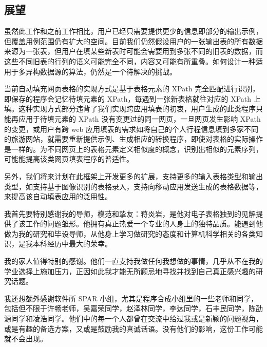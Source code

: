 \documentclass[design, pageheader]{njubachelor}
\begin{document}
\subsection{展望}
虽然此工作和之前工作相比，用户已经只需要提供更少的信息即部分的输出示例，但覆盖用例范围仍有扩大的空间。目前我们仍然假设用户的一张输出表的所有数据来源为一张表，但用户在填某些新表时可能会需要用到多张不同的旧表的数据，而这些不同旧表的行列的语义可能完全不同，内容又可能有所重叠。如何设计一种适用于多异构数据源的算法，仍然是一个待解决的挑战。

当前自动填充网页表格的实现方式是基于表格元素的 XPath 完全匹配进行识别，即保存的程序会记忆待填元素的 XPath，每遇到一张新表格就往对应的 XPath 上填。这种实现方式部分违背了我们实现跨应用填表的初衷，用户生成的此类程序只能再应用于待填元素的 XPath 没有变更过的同一网页，一旦网页发生影响 XPath 的变更，或用户有跨 web 应用填表的需求如将自己的个人行程信息填到多家不同的旅游网站，就需要重新提供示例、生成相应的转换程序，即使对表格的实际操作是一样的。为不同网页上的表格元素定义相似度的概念，识别出相似的元素序列\cite{wang13}，可能能提高该类网页填表程序的普适性。

另外，我们将来计划在此框架上开发更多的扩展，支持更多的输入表格类型和输出类型，如支持基于图像识别的表格录入，支持向移动应用发送生成的表格数据等，来提高该自动填表应用的泛用性。

\newpage
{}




\newpage
\ack

我首先要特别感谢我的导师，模范和挚友：蒋炎岩，是他对电子表格独到的见解提供了该工作的问题雏形。他拥有真正热爱一个专业的人身上的独特品质。能遇到他做为我的研究和毕设导师，从他身上学习做研究的态度和计算机科学相关的各类知识，是我本科经历中最大的荣幸。

我的家人值得特别的感谢。他们一直支持我做任何我想做的事情，几乎从不在我的学业选择上施加压力，正因如此我才能无所顾忌地寻找并找到自己真正感兴趣的研究话题。

我还想额外感谢软件所 SPAR 小组，尤其是程序合成小组里的一些老师和同学，包括但不限于许畅老师，吴嘉荣同学，赵泽林同学，李达同学，石丰民同学，陈劭源同学和凌浩同学。他们中的每一个人都曾在交流中给过我或是新颖的问题视角，或是有趣的备选方案，又或是鼓励我的真诚话语。没有他们的影响，这份工作可能就不会出现。

\newpage
\appendix
\end{document}
